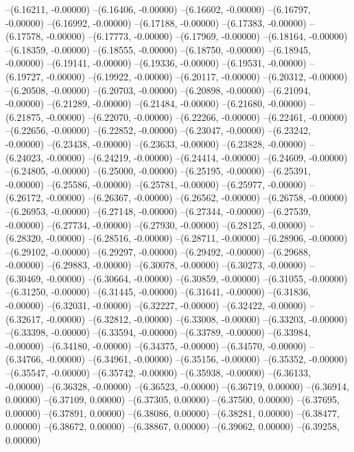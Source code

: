 --(6.16211, -0.00000)
--(6.16406, -0.00000)
--(6.16602, -0.00000)
--(6.16797, -0.00000)
--(6.16992, -0.00000)
--(6.17188, -0.00000)
--(6.17383, -0.00000)
--(6.17578, -0.00000)
--(6.17773, -0.00000)
--(6.17969, -0.00000)
--(6.18164, -0.00000)
--(6.18359, -0.00000)
--(6.18555, -0.00000)
--(6.18750, -0.00000)
--(6.18945, -0.00000)
--(6.19141, -0.00000)
--(6.19336, -0.00000)
--(6.19531, -0.00000)
--(6.19727, -0.00000)
--(6.19922, -0.00000)
--(6.20117, -0.00000)
--(6.20312, -0.00000)
--(6.20508, -0.00000)
--(6.20703, -0.00000)
--(6.20898, -0.00000)
--(6.21094, -0.00000)
--(6.21289, -0.00000)
--(6.21484, -0.00000)
--(6.21680, -0.00000)
--(6.21875, -0.00000)
--(6.22070, -0.00000)
--(6.22266, -0.00000)
--(6.22461, -0.00000)
--(6.22656, -0.00000)
--(6.22852, -0.00000)
--(6.23047, -0.00000)
--(6.23242, -0.00000)
--(6.23438, -0.00000)
--(6.23633, -0.00000)
--(6.23828, -0.00000)
--(6.24023, -0.00000)
--(6.24219, -0.00000)
--(6.24414, -0.00000)
--(6.24609, -0.00000)
--(6.24805, -0.00000)
--(6.25000, -0.00000)
--(6.25195, -0.00000)
--(6.25391, -0.00000)
--(6.25586, -0.00000)
--(6.25781, -0.00000)
--(6.25977, -0.00000)
--(6.26172, -0.00000)
--(6.26367, -0.00000)
--(6.26562, -0.00000)
--(6.26758, -0.00000)
--(6.26953, -0.00000)
--(6.27148, -0.00000)
--(6.27344, -0.00000)
--(6.27539, -0.00000)
--(6.27734, -0.00000)
--(6.27930, -0.00000)
--(6.28125, -0.00000)
--(6.28320, -0.00000)
--(6.28516, -0.00000)
--(6.28711, -0.00000)
--(6.28906, -0.00000)
--(6.29102, -0.00000)
--(6.29297, -0.00000)
--(6.29492, -0.00000)
--(6.29688, -0.00000)
--(6.29883, -0.00000)
--(6.30078, -0.00000)
--(6.30273, -0.00000)
--(6.30469, -0.00000)
--(6.30664, -0.00000)
--(6.30859, -0.00000)
--(6.31055, -0.00000)
--(6.31250, -0.00000)
--(6.31445, -0.00000)
--(6.31641, -0.00000)
--(6.31836, -0.00000)
--(6.32031, -0.00000)
--(6.32227, -0.00000)
--(6.32422, -0.00000)
--(6.32617, -0.00000)
--(6.32812, -0.00000)
--(6.33008, -0.00000)
--(6.33203, -0.00000)
--(6.33398, -0.00000)
--(6.33594, -0.00000)
--(6.33789, -0.00000)
--(6.33984, -0.00000)
--(6.34180, -0.00000)
--(6.34375, -0.00000)
--(6.34570, -0.00000)
--(6.34766, -0.00000)
--(6.34961, -0.00000)
--(6.35156, -0.00000)
--(6.35352, -0.00000)
--(6.35547, -0.00000)
--(6.35742, -0.00000)
--(6.35938, -0.00000)
--(6.36133, -0.00000)
--(6.36328, -0.00000)
--(6.36523, -0.00000)
--(6.36719, 0.00000)
--(6.36914, 0.00000)
--(6.37109, 0.00000)
--(6.37305, 0.00000)
--(6.37500, 0.00000)
--(6.37695, 0.00000)
--(6.37891, 0.00000)
--(6.38086, 0.00000)
--(6.38281, 0.00000)
--(6.38477, 0.00000)
--(6.38672, 0.00000)
--(6.38867, 0.00000)
--(6.39062, 0.00000)
--(6.39258, 0.00000)
